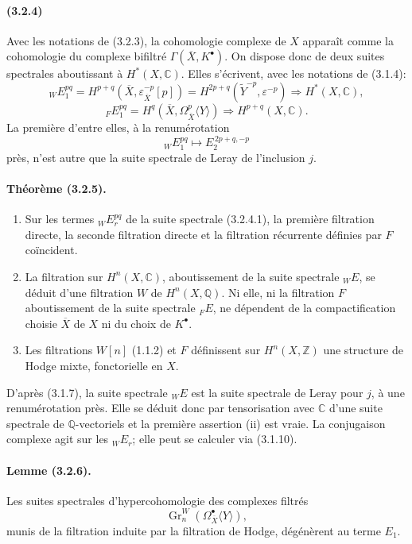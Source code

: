 \documentclass[10pt]{article}
\newcommand{\C}{\mathbb C}
\newcommand{\Q}{\mathbb Q}
\newcommand{\Z}{\mathbb Z}
\newcommand{\Gr}{\operatorname{Gr}}
\begin{document}
\paragraph{(3.2.4)} Avec les notations de (3.2.3), la cohomologie complexe de $X$ apparaît comme la cohomologie du complexe bifiltré $\Gamma(\overline X,K^\bullet)$. On dispose donc de deux suites spectrales aboutissant à $H^*(X,\C)$. Elles s'écrivent, avec les notations de (3.1.4):
\[
\tag{3.2.4.1}
{}_W E_1^{pq}
 =H^{p+q}(\overline X,\varepsilon_{\overline X}^{-p}[p])
 =H^{2p+q}(\widetilde Y^{-p},\varepsilon^{-p})
 \Longrightarrow H^*(X,\C),
\]
\[
\tag{3.2.4.2}
{}_F E_1^{pq}
 =H^q(\overline X,\Omega_{\overline X}^p\langle Y\rangle)
 \Longrightarrow H^{p+q}(X,\C).
\]
La première d'entre elles, à la renumérotation
\[
{}_W E_1^{pq}\longmapsto E_2^{\,2p+q,-p}
\]
près, n'est autre que la suite spectrale de Leray de l'inclusion $j$.

\paragraph{Théorème (3.2.5).} 
\begin{enumerate}[label=(\roman*)]
\item Sur les termes ${}_WE_r^{pq}$ de la suite spectrale (3.2.4.1), la première filtration directe, la seconde filtration directe et la filtration récurrente définies par $F$ coïncident.
\item La filtration sur $H^n(X,\C)$, aboutissement de la suite spectrale ${}_WE$, se déduit d'une filtration $W$ de $H^n(X,\Q)$. Ni elle, ni la filtration $F$ aboutissement de la suite spectrale ${}_FE$, ne dépendent de la compactification choisie $\overline X$ de $X$ ni du choix de $K^\bullet$.
\item Les filtrations $W[n]$ (1.1.2) et $F$ définissent sur $H^n(X,\Z)$ une structure de Hodge mixte, fonctorielle en $X$.
\end{enumerate}

D'après (3.1.7), la suite spectrale ${}_WE$ est la suite spectrale de Leray pour $j$, à une renumérotation près. Elle se déduit donc par tensorisation avec $\C$ d'une suite spectrale de $\Q$-vectoriels et la première assertion (ii) est vraie. La conjugaison complexe agit sur les ${}_WE_r$; elle peut se calculer via (3.1.10).

\paragraph{Lemme (3.2.6).} Les suites spectrales d'hypercohomologie des complexes filtrés
\[
\Gr_n^W(\Omega_{\overline X}^{\bullet}\langle Y\rangle),
\]
munis de la filtration induite par la filtration de Hodge, dégénèrent au terme $E_1$.
\end{document}
